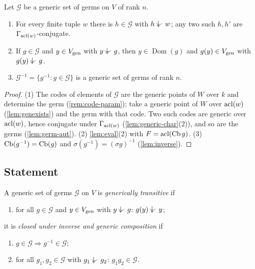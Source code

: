 \begin{lemma}\label{lem:genset-basic}
Let $\mathcal G$ be a generic set of germs on $V$ of rank $n$.
\begin{enumerate}[nosep]
\item For every finite tuple $w$ there is $h\in\mathcal G$ with $h\ind{}w$; any two such
  $h,h'$ are $\Gamma_{\operatorname{acl}(w)}$-conjugate.
\item If $g\in\mathcal G$ and $y\in V_{\operatorname{gen}}$ with $y\ind{}g$, then $y\in\operatorname{Dom}(g)$
  and $g(y)\in V_{\operatorname{gen}}$ with $g(y)\ind{}g$.
\item $\mathcal G^{-1}=\{g^{-1}:g\in\mathcal G\}$ is a generic set of germs of rank $n$.
\end{enumerate}
\end{lemma}
\begin{proof}
(1) The codes of elements of $\mathcal G$ are the generic points of $W$ over $k$ and
determine the germ (\cref{rem:code-param}); take a generic point of $W$ over $\operatorname{acl}(w)$
(\cref{lem:genexists}) and the germ with that code.  Two such codes are generic over
$\operatorname{acl}(w)$, hence conjugate under $\Gamma_{\operatorname{acl}(w)}$ (\cref{lem:generic-char}(2)), and
so are the germs (\cref{lem:germ-aut}).
(2) \cref{lem:eval}(2) with $F=\operatorname{acl}(\operatorname{Cb} g)$.  (3) $\operatorname{Cb}(g^{-1})=\operatorname{Cb}(g)$ and
$\sigma(g^{-1})=(\sigma g)^{-1}$ (\cref{lem:inverse}).
\end{proof}

\subsection{Statement}

\begin{definition}\label{def:hw-hyp}
A generic set of germs $\mathcal G$ on $V$ is \emph{generically transitive} if
\begin{enumerate}[label=\textup{(H\arabic*)}]
\item\label{H:trans} for all $g\in\mathcal G$ and $y\in V_{\operatorname{gen}}$ with $y\ind{}g$:
  $g(y)\ind{}y$;
\end{enumerate}
it is \emph{closed under inverse and generic composition} if
\begin{enumerate}[label=\textup{(H\arabic*)},start=2]
\item\label{H:inv} $g\in\mathcal G\Rightarrow g^{-1}\in\mathcal G$;
\item\label{H:comp} for all $g_1,g_2\in\mathcal G$ with $g_1\ind{}g_2$: $g_1g_2\in\mathcal G$.
\end{enumerate}
\end{definition}

